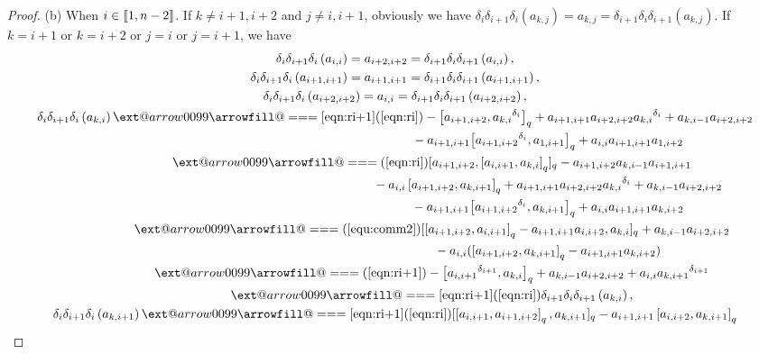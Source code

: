 \documentclass[10pt,a4paper]{amsart}
\makeatletter
\def\x@arrow{\DOTSB\Relbar}
\def\xlongequalsignfill@{\arrowfill@\x@arrow\Relbar\x@arrow}
\providecommand{\xlongequal}[2][]{%
	\ext@arrow 0099\xlongequalsignfill@{#1}{#2}}
\numberwithin{equation}{section}
\def\lr#1{\left[#1\right]}
\def\lrb#1{\left(#1\right)}
\def\d{\delta}
\def\lbb#1{\left[\kern-0.15em\left[ {#1} \right] \kern-0.15em\right]}
\makeatother
\begin{document}
\begin{proof}
(b) When $i \in \lbb{1,n-2}$.
If $k \neq i+1, i+2$ and $j\neq i, i+1$, obviously we have
$\d_i\d_{i+1}\d_i\lrb{a_{k,j}}=a_{k,j}=\d_{i+1}\d_i\d_{i+1}\lrb{a_{k,j}}$.
If $k=i+1$ or $k=i+2$ or $j=i$ or $j=i+1$, we have
\begin{gather*}
 \d_i\d_{i+1}\d_i\lrb{a_{i,i}}
=a_{i+2,i+2}
=\d_{i+1}\d_i\d_{i+1}\lrb{a_{i,i}},\\
 \d_i\d_{i+1}\d_i\lrb{a_{i+1,i+1}}
=a_{i+1,i+1}
=\d_{i+1}\d_i\d_{i+1}\lrb{a_{i+1,i+1}},\\
 \d_i\d_{i+1}\d_i\lrb{a_{i+2,i+2}}
=a_{i,i}
=\d_{i+1}\d_i\d_{i+1}\lrb{a_{i+2,i+2}},\\
 \d_i\d_{i+1}\d_i\lrb{a_{k,i}}
 \xlongequal[\eqref{eqn:ri+1}]{\lrb{\ref{eqn:ri}}} -\bigl[a_{i+1,i+2}, {a_{k,i}}^{\d_{i}}\bigr]_q+a_{i+1,i+1}a_{i+2,i+2} {a_{k,i}}^{\d_{i}}+a_{k,i-1}a_{i+2,i+2}\\
\phantom{ \d_i\d_{i+1}\d_i\lrb{a_{k,i}}\xlongequal{\qquad}\!\! }{} -a_{i+1,i+1}\bigl[ {a_{i+1,i+2}}^{\d_{i}}, a_{1,i+1}\bigr]_q+a_{i,i}a_{i+1,i+1}a_{1,i+2}\\
 \phantom{ \d_i\d_{i+1}\d_i\lrb{a_{k,i}} }{} \xlongequal{\lrb{\ref{eqn:ri}}} [a_{i+1,i+2},\lr{a_{i,i+1}, a_{k,i}}_q]_q -a_{i+1,i+2}a_{k,i-1}a_{i+1,i+1}\\
 \phantom{ \d_i\d_{i+1}\d_i\lrb{a_{k,i}}\xlongequal{\qquad}\!\! }{} -a_{i,i}\lr{a_{i+1,i+2}, a_{k,i+1}}_q +a_{i+1,i+1}a_{i+2,i+2} {a_{k,i}}^{\d_{i}} +a_{k,i-1}a_{i+2,i+2}\\
 \phantom{ \d_i\d_{i+1}\d_i\lrb{a_{k,i}}\xlongequal{\qquad}\!\! }{} -a_{i+1,i+1}\bigl[{a_{i+1,i+2}}^{\d_{i}}, a_{k,i+1}\bigr]_q +a_{i,i}a_{i+1,i+1}a_{k,i+2}\\
 \phantom{ \d_i\d_{i+1}\d_i\lrb{a_{k,i}} }{} \xlongequal{\lrb{\ref{equ:comm2}}} [\lr{a_{i+1,i+2}, a_{i,i+1}}_q -a_{i+1,i+1}a_{i,i+2}, a_{k,i}]_q+a_{k,i-1}a_{i+2,i+2}\\
 \phantom{ \d_i\d_{i+1}\d_i\lrb{a_{k,i}}\xlongequal{\qquad}\!\! }{} -a_{i,i}(\lr{a_{i+1,i+2}, a_{k,i+1}}_q-a_{i+1,i+1}a_{k,i+2})\\
 \phantom{ \d_i\d_{i+1}\d_i\lrb{a_{k,i}} }{} \xlongequal{\lrb{\ref{eqn:ri+1}}} -\bigl[{a_{i,i+1}}^{\d_{i+1}}, a_{k,i}\bigr]_q+a_{k,i-1}a_{i+2,i+2} +a_{i,i}{a_{k,i+1}}^{\d_{i+1}}\\
 \phantom{ \d_i\d_{i+1}\d_i\lrb{a_{k,i}} }{} \xlongequal[\eqref{eqn:ri+1}]{\lrb{\ref{eqn:ri}}} \d_{i+1}\d_i\d_{i+1}\lrb{a_{k,i}}, \\ \d_i\d_{i+1}\d_i\lrb{a_{k,i+1}}
 \xlongequal[\eqref{eqn:ri+1}]{\lrb{\ref{eqn:ri}}} [\lr{a_{i,i+1}, a_{i+1,i+2}}_q, a_{k,i+1}]_q -a_{i+1,i+1}\lr{a_{i,i+2}, a_{k,i+1}}_q \\

\end{gather*}
\end{proof}
\end{document}
